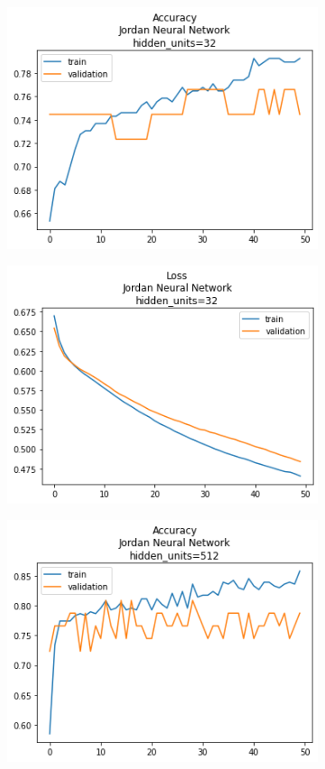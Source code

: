 \documentclass[12pt, a4paper]{article}
\begin{document}
\begin{figure}
\begin{subfigure}{0.45\linewidth}
        \includegraphics[width=0.9\linewidth]{images/q1/jordan/acc_Jordan Neural Networkhidden_units=32.png}
    \end{subfigure}
    \hfill
    \begin{subfigure}{0.45\linewidth}
        \includegraphics[width=0.9\linewidth]{images/q1/jordan/loss_Jordan Neural Networkhidden_units=32.png}
    \end{subfigure}
    \begin{subfigure}{0.45\linewidth}
        \includegraphics[width=0.9\linewidth]{images/q1/jordan/acc_Jordan Neural Networkhidden_units=512.png}

\end{subfigure}
\end{figure}
\end{document}
